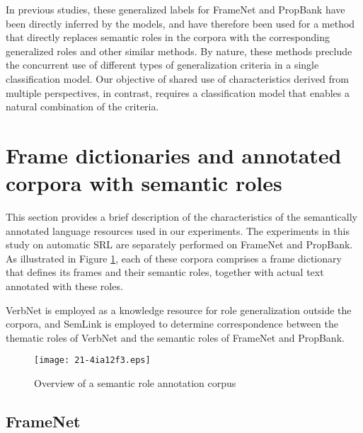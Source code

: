 \documentclass[english]{jnlp_1.4_rep}
\begin{document}
In previous studies, these generalized labels for FrameNet and PropBank have been directly inferred by the models, and have therefore been used for a method that directly replaces semantic roles in the corpora with the corresponding generalized roles and other similar methods. By nature, these methods preclude the concurrent use of different types of generalization criteria in a single classification model. Our objective of shared use of characteristics derived from multiple perspectives, in contrast, requires a classification model that enables a natural combination of the criteria.


\section{Frame dictionaries and annotated corpora with semantic roles}

This section provides a brief description of the characteristics of the semantically annotated language resources used in our experiments. The experiments in this study on automatic SRL are separately performed on FrameNet and PropBank. As illustrated in Figure \ref{fig:semantic-corpus}, each of these corpora comprises a frame dictionary that defines its frames and their semantic roles, together with actual text annotated 
with these roles.

VerbNet is employed as a knowledge resource for role generalization outside the corpora, and SemLink is employed to determine correspondence between the thematic roles of VerbNet and the semantic roles of FrameNet and PropBank.

\begin{figure}[t]
\begin{center}
\texttt{[image: 21-4ia12f3.eps]}
\end{center}
\caption{Overview of a semantic role annotation corpus}
\label{fig:semantic-corpus}
\end{figure}


\subsection{FrameNet}
\label{sec:framenet}
\end{document}
